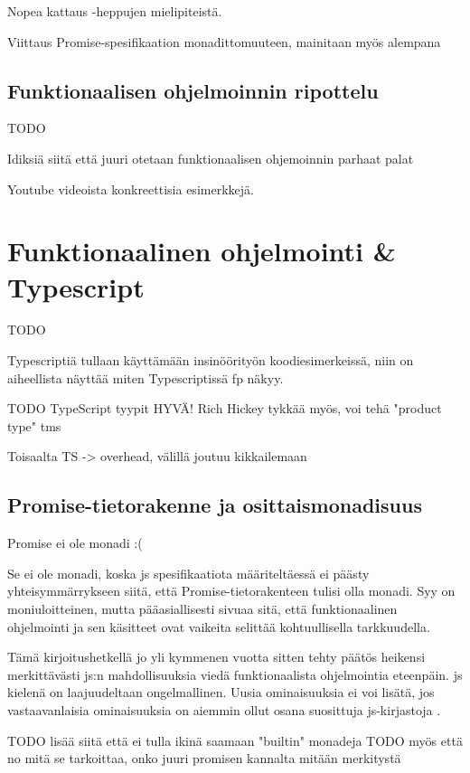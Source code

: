 Nopea kattaus  -heppujen mielipiteistä.

Viittaus Promise-spesifikaation monadittomuuteen, mainitaan myös alempana

\subsection{Funktionaalisen ohjelmoinnin ripottelu}

TODO

Idiksiä siitä että juuri otetaan funktionaalisen ohjemoinnin parhaat palat

Youtube videoista konkreettisia esimerkkejä.

\section{Funktionaalinen ohjelmointi \& Typescript}


TODO

Typescriptiä tullaan käyttämään insinöörityön koodiesimerkeissä, niin on aiheellista näyttää miten Typescriptissä \gls{fp} näkyy.

TODO TypeScript tyypit HYVÄ! Rich Hickey tykkää myös, voi tehä "product type" tms

Toisaalta TS -> overhead, välillä joutuu kikkailemaan

\subsection{Promise-tietorakenne ja osittaismonadisuus}

Promise ei ole monadi :( \cite{read-it-later-11481,promises-spec-94}

Se ei ole monadi, koska \gls{js} spesifikaatiota määriteltäessä ei päästy yhteisymmärrykseen siitä, että Promise-tietorakenteen tulisi olla monadi. Syy on moniuloitteinen, mutta pääasiallisesti sivuaa sitä, että funktionaalinen ohjelmointi ja sen käsitteet ovat vaikeita selittää kohtuullisella tarkkuudella. \citep{promises-spec-94}

Tämä kirjoitushetkellä jo yli kymmenen vuotta sitten tehty päätös heikensi merkittävästi \gls{js}:n mahdollisuuksia viedä funktionaalista ohjelmointia eteenpäin. \Gls{js} kielenä on laajuudeltaan ongelmallinen. Uusia ominaisuuksia ei voi lisätä, jos vastaavanlaisia ominaisuuksia on aiemmin ollut osana suosittuja \gls{js}-kirjastoja \cite{proposal-joint-iteration,prototype_library_trends}.

TODO lisää siitä että ei tulla ikinä saamaan "builtin" monadeja
TODO myös että no mitä se tarkoittaa, onko juuri promisen kannalta mitään merkitystä

